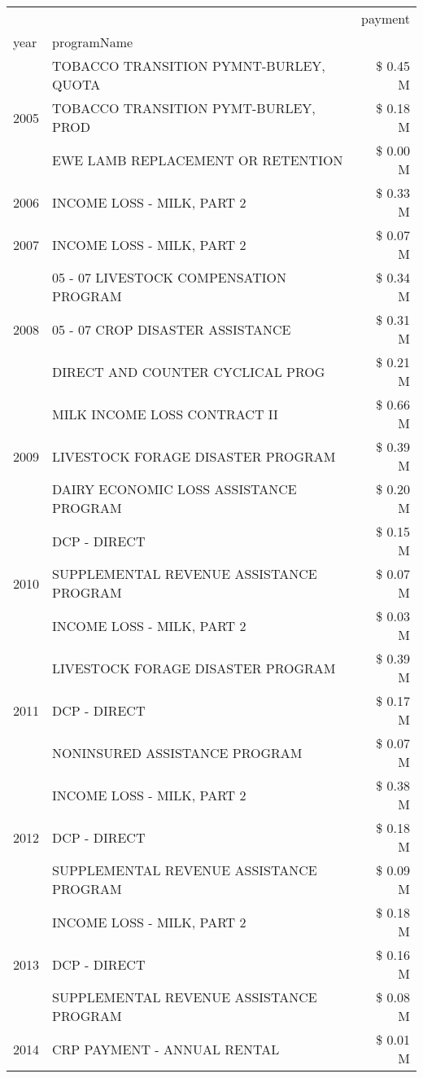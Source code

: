 \begin{tabular}{llr}
\toprule
 &  & payment \\
year & programName &  \\
\midrule
\multirow[t]{3}{*}{2005} & TOBACCO TRANSITION PYMNT-BURLEY, QUOTA & \$ 0.45 M \\
 & TOBACCO TRANSITION PYMT-BURLEY, PROD & \$ 0.18 M \\
 & EWE LAMB REPLACEMENT OR RETENTION & \$ 0.00 M \\
\cline{1-3}
2006 & INCOME LOSS - MILK, PART 2 & \$ 0.33 M \\
\cline{1-3}
2007 & INCOME LOSS - MILK, PART 2 & \$ 0.07 M \\
\cline{1-3}
\multirow[t]{3}{*}{2008} & 05 - 07 LIVESTOCK COMPENSATION PROGRAM & \$ 0.34 M \\
 & 05 - 07 CROP DISASTER ASSISTANCE & \$ 0.31 M \\
 & DIRECT AND COUNTER CYCLICAL PROG & \$ 0.21 M \\
\cline{1-3}
\multirow[t]{3}{*}{2009} & MILK INCOME LOSS CONTRACT II & \$ 0.66 M \\
 & LIVESTOCK FORAGE DISASTER  PROGRAM & \$ 0.39 M \\
 & DAIRY ECONOMIC LOSS ASSISTANCE PROGRAM & \$ 0.20 M \\
\cline{1-3}
\multirow[t]{3}{*}{2010} & DCP - DIRECT & \$ 0.15 M \\
 & SUPPLEMENTAL REVENUE ASSISTANCE PROGRAM & \$ 0.07 M \\
 & INCOME LOSS - MILK, PART 2 & \$ 0.03 M \\
\cline{1-3}
\multirow[t]{3}{*}{2011} & LIVESTOCK FORAGE DISASTER PROGRAM & \$ 0.39 M \\
 & DCP - DIRECT & \$ 0.17 M \\
 & NONINSURED ASSISTANCE PROGRAM & \$ 0.07 M \\
\cline{1-3}
\multirow[t]{3}{*}{2012} & INCOME LOSS - MILK, PART 2 & \$ 0.38 M \\
 & DCP - DIRECT & \$ 0.18 M \\
 & SUPPLEMENTAL REVENUE ASSISTANCE PROGRAM & \$ 0.09 M \\
\cline{1-3}
\multirow[t]{3}{*}{2013} & INCOME LOSS - MILK, PART 2 & \$ 0.18 M \\
 & DCP - DIRECT & \$ 0.16 M \\
 & SUPPLEMENTAL REVENUE ASSISTANCE PROGRAM & \$ 0.08 M \\
\cline{1-3}
\multirow[t]{2}{*}{2014} & CRP PAYMENT - ANNUAL RENTAL & \$ 0.01 M \\

\end{tabular}
